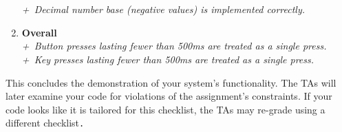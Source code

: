 \begin{enumerate}
{    \parbox{3cm}{\raggedleft{}} \\
    \parbox{3cm}{\raggedleft{}} \\
    \textit{+\textonehalf\ Decimal number base (negative values) is implemented correctly.}}
\item [] \textbf{Overall} \\
    \textit{+\textonehalf\ Button presses lasting fewer than 500ms are treated as a single press.} \\
    \textit{+\textonehalf\ Key presses lasting fewer than 500ms are treated as a single press.}
\end{enumerate}

This concludes the demonstration of your system's functionality. The TAs will
later examine your code for violations of the assignment's constraints. If your
code looks like it is tailored for this checklist, the TAs may re-grade using a
different checklist\texttt{.}

